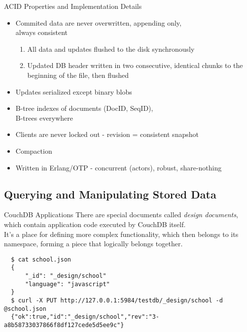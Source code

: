 \documentclass{beamer}
\begin{document}
\begin{frame}{ACID Properties and Implementation Details}
  \begin{itemize}
    \item Commited data are never overwritten, appending only,\\always consistent
    \begin{enumerate}
      \item All data and updates flushed to the disk synchronously
      \item Updated DB header written in two consecutive, identical chunks
            to the beginning of the file, then flushed
    \end{enumerate}
    \item Updates serialized except binary blobs
    \item B-tree indexes of documents (DocID, SeqID),\\B-trees everywhere
    \item Clients are never locked out - revision = consistent snapshot
    \item Compaction
    \item Written in Erlang/OTP - concurrent (actors), robust, share-nothing
  \end{itemize}
\end{frame}

\subsection{Querying and Manipulating Stored Data}
\begin{frame}[fragile]{CouchDB Applications}
  There are special documents called \textit{design documents},\\which contain
  application code executed by CouchDB itself.\\It's a place for defining
  more complex functionality, which then belongs to its namespace, forming
  a piece that logically belongs together.
  \fontsize{6}{8}\selectfont
  \begin{verbatim}
  $ cat school.json 
  {
      "_id": "_design/school"
      "language": "javascript"
  }
  $ curl -X PUT http://127.0.0.1:5984/testdb/_design/school -d @school.json
  {"ok":true,"id":"_design/school","rev":"3-a8b58733037866f8df127cede5d5ee9c"}
  \end{verbatim}
\end{frame}
\end{document}

